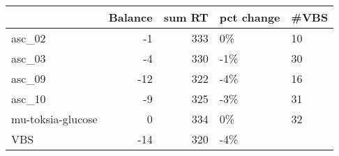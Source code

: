 \begin{tabular}{lrrll}
\toprule
{} &  Balance &  sum RT & pct change & \#VBS \\
\midrule
asc\_02            &       -1 &     333 &         0\% &   10 \\
asc\_03            &       -4 &     330 &        -1\% &   30 \\
asc\_09            &      -12 &     322 &        -4\% &   16 \\
asc\_10            &       -9 &     325 &        -3\% &   31 \\
mu-toksia-glucose &        0 &     334 &         0\% &   32 \\
VBS               &      -14 &     320 &        -4\% &      \\
\bottomrule
\end{tabular}
